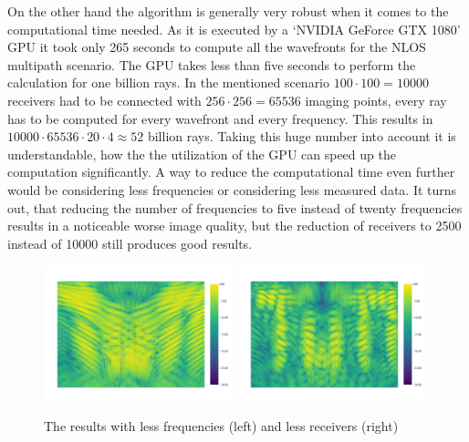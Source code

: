 On the other hand the algorithm is generally very robust when it comes to the computational time needed.
As it is executed by a `NVIDIA GeForce GTX 1080' GPU it took only 265 seconds to compute all the wavefronts for the NLOS multipath scenario.
The GPU takes less than five seconds to perform the calculation for one billion rays.
In the mentioned scenario \(100 \cdot 100 = 10000\) receivers had to be connected with \(256 \cdot 256 = 65536\) imaging points, every ray has to be computed for every wavefront and every frequency.
This results in \(10000 \cdot 65536 \cdot 20 \cdot 4 \approx 52\) billion rays.
Taking this huge number into account it is understandable, how the the utilization of the GPU can speed up the computation significantly.
A way to reduce the computational time even further would be considering less frequencies or considering less measured data.
It turns out, that reducing the number of frequencies to five instead of twenty frequencies results in a noticeable worse image quality, but the reduction of receivers to 2500 instead of 10000 still produces good results.

\begin{figure}[h]
    \centering
    \includegraphics[page=1, width=0.49\textwidth]{figures/multipath_nlos_reduced_freq.pdf}
    \includegraphics[page=1, width=0.49\textwidth]{figures/multipath_nlos_reduced_receiver.pdf}
    \caption{The results with less frequencies (left) and less receivers (right)}\label{fig:MultipathNLOS_time_optimized}
\end{figure}

